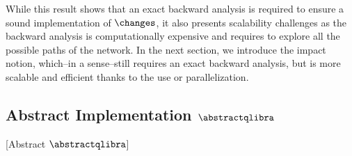 While this result shows that an exact backward analysis is required to ensure a sound implementation of $\changes$, it also presents scalability challenges as the backward analysis is computationally expensive and requires to explore all the possible paths of the network.
In the next section, we introduce the \qlibraname{} impact notion, which--in a sense--still requires an exact backward analysis, but is more scalable and efficient thanks to the use or parallelization.

\subsection{Abstract Implementation \texorpdfstring{$\abstractqlibra$}{Abstract QLibra}}[Abstract \texorpdfstring{$\abstractqlibra$}{QLibra}]




